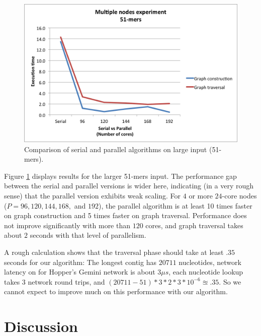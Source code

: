\documentclass{article}
\begin{document}
\begin{figure}
  \includegraphics[width=\textwidth]{plots/Result_multiple_large.png}
  \caption{Comparison of serial and parallel algorithms on large input (51-mers).}
  \label{fig:large}
\end{figure}

Figure \ref{fig:large} displays results for the larger 51-mers input.  The performance gap between the serial and parallel versions is wider here, indicating (in a very rough sense) that the parallel version exhibits weak scaling.  For $4$ or more $24$-core nodes ($P=96,120,144,168,$ and $192$), the parallel algorithm is at least 10 times faster on graph construction and 5 times faster on graph traversal.  Performance does not improve significantly with more than $120$ cores, and graph traversal takes about $2$ seconds with that level of parallelism.

A rough calculation shows that the traversal phase should take at least $.35$ seconds for our algorithm: The longest contig has $20711$ nucleotides, network latency on for Hopper's Gemini network is about $3 \mu s$, each nucleotide lookup takes $3$ network round trips, and $(20711-51)*3*2*3*10^{-6} \approxeq .35$.  So we cannot expect to improve much on this performance with our algorithm.

\section{Discussion}
\end{document}
